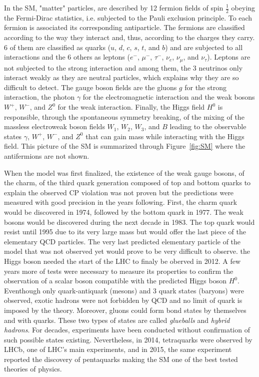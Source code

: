 	In the SM, "matter" particles, are described by 12 fermion fields of spin $\frac{1}{2}$ obeying the Fermi-Dirac statistics, i.e. subjected to the Pauli exclusion principle. To each fermion is associated its corresponding antiparticle. The fermions are classified according to the way they interact and, thus, according to the charges they carry. 6 of them are classified as quarks ($u$, $d$, $c$, $s$, $t$, and $b$) and are subjected to all interactions and the 6 others as leptons ($e^-$, $\mu^-$, $\tau^-$, $\nu_e$, $\nu_\mu$, and $\nu_\tau$). Leptons are not subjected to the strong interaction and among them, the 3 neutrinos only interact weakly as they are neutral particles, which explains why they are so difficult to detect. The gauge boson fields are the gluons $g$ for the strong interaction, the photon $\gamma$ for the electromagnetic interaction and the weak bosons $W^+$, $W^-$, and $Z^0$ for the weak interaction. Finally, the Higgs field $H^0$ is responsible, through the spontaneous symmetry breaking, of the mixing of the massless electroweak boson fields $W_1$, $W_2$, $W_3$, and $B$ leading to the observable states $\gamma$, $W^+$, $W^-$, and $Z^0$ that can gain mass while interacting with the Higgs field. This picture of the SM is summarized through Figure~\ref{fig:SM} where the antifermions are not shown.
	
	When the model was first finalized, the existence of the weak gauge bosons, of the charm, of the third quark generation composed of top and bottom quarks to explain the observed CP violation was not proven but the predictions were measured with good precision in the years following. First, the charm quark would be discovered in 1974, followed by the bottom quark in 1977. The weak bosons would be discovered during the next decade in 1983. The top quark would resist until 1995 due to its very large mass but would offer the last piece of the elementary QCD particles. The very last predicted elementary particle of the model that was not observed yet would prove to be very difficult to observe. the Higgs boson needed the start of the LHC to finaly be oberved in 2012. A few years more of tests were necessary to measure its properties to confirm the observation of a scalar boson compatible with the predicted Higgs boson $H^0$. Eventhough only quark-antiquark (mesons) and 3 quark states (baryons) were observed, exotic hadrons were not forbidden by QCD and no limit of quark is imposed by the theory. Moreover, gluons could form bond states by themselves and with quarks. These two types of states are called \textit{glueballs} and \textit{hybrid hadrons}. For decades, experiments have been conducted without confirmation of such possible states existing. Nevertheless, in 2014, tetraquarks were observed by LHCb, one of LHC's main experiments, and in 2015, the same experiment reported the discovery of pentaquarks making the SM one of the best tested theories of physics.
	
